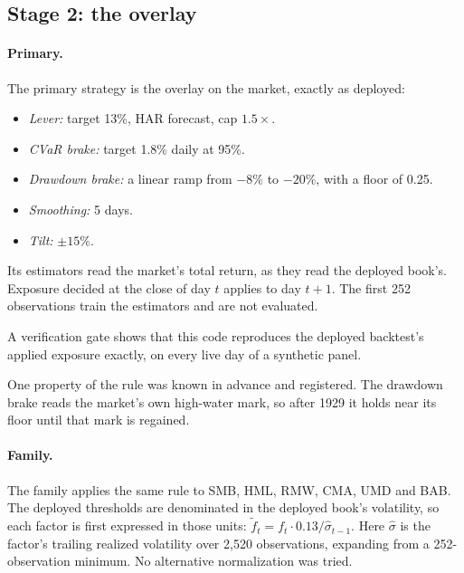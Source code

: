 \documentclass[11pt]{article}
\begin{document}
\subsection{Stage 2: the overlay}

\paragraph{Primary.} The primary strategy is the overlay on the market,
exactly as deployed:
\begin{itemize}
\item \emph{Lever:} target 13\%, HAR forecast, cap $1.5\times$.
\item \emph{CVaR brake:} target 1.8\% daily at 95\%.
\item \emph{Drawdown brake:} a linear ramp from $-8\%$ to $-20\%$, with a
  floor of 0.25.
\item \emph{Smoothing:} 5 days.
\item \emph{Tilt:} $\pm15\%$.
\end{itemize}
Its estimators read the market's total return, as they read the deployed
book's. Exposure decided at the close of day $t$ applies to day $t+1$. The
first 252 observations train the estimators and are not evaluated.

A verification gate shows that this code reproduces the deployed backtest's
applied exposure exactly, on every live day of a synthetic panel.

One property of the rule was known in advance and registered. The drawdown
brake reads the market's own high-water mark, so after 1929 it holds near
its floor until that mark is regained.

\paragraph{Family.} The family applies the same rule to SMB, HML, RMW, CMA,
UMD and BAB. The deployed thresholds are denominated in the deployed book's
volatility, so each factor is first expressed in those units:
$\tilde f_t = f_t \cdot 0.13/\hat\sigma_{t-1}$. Here $\hat\sigma$ is the
factor's trailing realized volatility over 2{,}520 observations, expanding
from a 252-observation minimum. No alternative normalization was tried.
\end{document}
